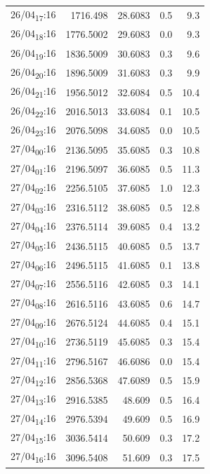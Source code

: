 \documentclass[11pt]{article}
\begin{document}
\begin{table}[htbp]
\begin{tabular}{lrrrr}
26/04\textsubscript{17}:16 & 1716.498 & 28.6083 & 0.5 & 9.3\\[0pt]
26/04\textsubscript{18}:16 & 1776.5002 & 29.6083 & 0.0 & 9.3\\[0pt]
26/04\textsubscript{19}:16 & 1836.5009 & 30.6083 & 0.3 & 9.6\\[0pt]
26/04\textsubscript{20}:16 & 1896.5009 & 31.6083 & 0.3 & 9.9\\[0pt]
26/04\textsubscript{21}:16 & 1956.5012 & 32.6084 & 0.5 & 10.4\\[0pt]
26/04\textsubscript{22}:16 & 2016.5013 & 33.6084 & 0.1 & 10.5\\[0pt]
26/04\textsubscript{23}:16 & 2076.5098 & 34.6085 & 0.0 & 10.5\\[0pt]
27/04\textsubscript{00}:16 & 2136.5095 & 35.6085 & 0.3 & 10.8\\[0pt]
27/04\textsubscript{01}:16 & 2196.5097 & 36.6085 & 0.5 & 11.3\\[0pt]
27/04\textsubscript{02}:16 & 2256.5105 & 37.6085 & 1.0 & 12.3\\[0pt]
27/04\textsubscript{03}:16 & 2316.5112 & 38.6085 & 0.5 & 12.8\\[0pt]
27/04\textsubscript{04}:16 & 2376.5114 & 39.6085 & 0.4 & 13.2\\[0pt]
27/04\textsubscript{05}:16 & 2436.5115 & 40.6085 & 0.5 & 13.7\\[0pt]
27/04\textsubscript{06}:16 & 2496.5115 & 41.6085 & 0.1 & 13.8\\[0pt]
27/04\textsubscript{07}:16 & 2556.5116 & 42.6085 & 0.3 & 14.1\\[0pt]
27/04\textsubscript{08}:16 & 2616.5116 & 43.6085 & 0.6 & 14.7\\[0pt]
27/04\textsubscript{09}:16 & 2676.5124 & 44.6085 & 0.4 & 15.1\\[0pt]
27/04\textsubscript{10}:16 & 2736.5119 & 45.6085 & 0.3 & 15.4\\[0pt]
27/04\textsubscript{11}:16 & 2796.5167 & 46.6086 & 0.0 & 15.4\\[0pt]
27/04\textsubscript{12}:16 & 2856.5368 & 47.6089 & 0.5 & 15.9\\[0pt]
27/04\textsubscript{13}:16 & 2916.5385 & 48.609 & 0.5 & 16.4\\[0pt]
27/04\textsubscript{14}:16 & 2976.5394 & 49.609 & 0.5 & 16.9\\[0pt]
27/04\textsubscript{15}:16 & 3036.5414 & 50.609 & 0.3 & 17.2\\[0pt]
27/04\textsubscript{16}:16 & 3096.5408 & 51.609 & 0.3 & 17.5\\[0pt]

\end{tabular}
\end{table}
\end{document}
